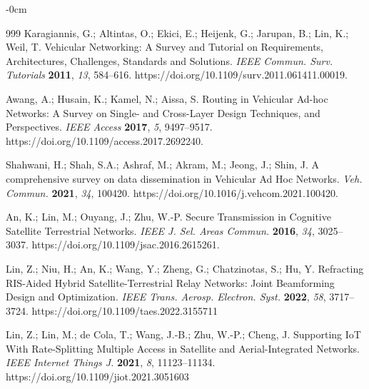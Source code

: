 \documentclass[electronics,aricle,accept,pdftex,moreauthors]{Definitions/mdpi}
\begin{document}
\begin{adjustwidth}{-\extralength}{0cm}
 \begin{thebibliography}{999}
Karagiannis, G.; Altintas, O.; Ekici, E.; Heijenk, G.; Jarupan, B.; Lin, K.; Weil, T. Vehicular Networking: A Survey and Tutorial on Requirements, Architectures, Challenges, Standards and Solutions. \emph{IEEE Commun. Surv. Tutorials} \textbf{2011}, \emph{13}, 584--616. https://doi.org/10.1109/surv.2011.061411.00019.

Awang, A.; Husain, K.; Kamel, N.; Aissa, S. Routing in Vehicular Ad-hoc Networks: A Survey on Single- and Cross-Layer Design Techniques, and Perspectives. \emph{IEEE Access} \textbf{2017}, \emph{5}, 9497–9517. https://doi.org/10.1109/access.2017.2692240.

Shahwani, H.; Shah, S.A.; Ashraf, M.; Akram, M.; Jeong, J.; Shin, J. A comprehensive survey on data dissemination in Vehicular Ad Hoc Networks. \emph{Veh. Commun. }\textbf{2021}, \emph{34}, 100420. https://doi.org/10.1016/j.vehcom.2021.100420.

An, K.; Lin, M.; Ouyang, J.; Zhu, W.-P. Secure Transmission in Cognitive Satellite Terrestrial Networks. \emph{IEEE J. Sel. Areas Commun. }\textbf{2016}, \emph{34}, 3025–3037. https://doi.org/10.1109/jsac.2016.2615261.

Lin, Z.; Niu, H.; An, K.; Wang, Y.; Zheng, G.; Chatzinotas, S.; Hu, Y. Refracting RIS-Aided Hybrid Satellite-Terrestrial Relay Networks: Joint Beamforming Design and Optimization. \emph{IEEE Trans. Aerosp. Electron. Syst.} \textbf{2022}, \emph{58}, 3717--3724. https://doi.org/10.1109/taes.2022.3155711

Lin, Z.; Lin, M.; de Cola, T.; Wang, J.-B.; Zhu, W.-P.; Cheng, J. Supporting IoT With Rate-Splitting Multiple Access in Satellite and Aerial-Integrated Networks. \emph{IEEE Internet Things J. }\textbf{2021}, \emph{8}, 11123--11134. https://doi.org/10.1109/jiot.2021.3051603


\end{thebibliography}
\end{adjustwidth}
\end{document}
